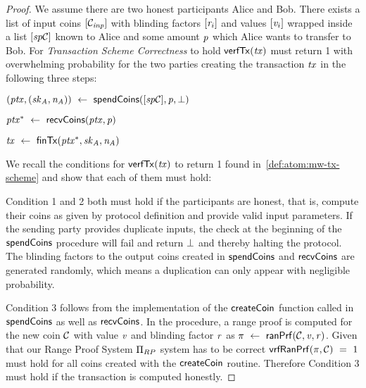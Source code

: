 \begin{proof}
    We assume there are two honest participants Alice and Bob.
    There exists a list of input coins $[\mathcal{C}_{\mathit{inp}}]$ with blinding factors $[\mathit{r}_i]$ and values $[\mathit{v}_i]$ wrapped inside a list $[\mathit{sp}\mathcal{C}]$ known to Alice and some amount $\mathit{p}$ which Alice wants to transfer to Bob.
    For \emph{Transaction Scheme Correctness} to hold $\mathsf{verfTx}(\mathit{tx})$ must return 1 with overwhelming probability for the two parties creating the transaction $\mathit{tx}$ in the following three steps:
    \begin{asparaenum}
        \item $(\mathit{ptx}, (\mathit{sk}_{\mathit{A}}, \mathit{\mathit{n}_{\mathit{A}}})) ~\leftarrow~ \mathsf{spendCoins}([\mathit{sp}\mathcal{C}],\mathit{p},\bot)$
        \item $\mathit{ptx}^* ~\leftarrow~ \mathsf{recvCoins}(\mathit{ptx},\mathit{p})$
        \item $\mathit{tx} ~\leftarrow~ \mathsf{finTx}(\mathit{ptx}^*,\mathit{sk}_{\mathit{A}},\mathit{\mathit{n}_{\mathit{A}}})$
    \end{asparaenum}
    We recall the conditions for $\mathsf{verfTx}(\mathit{tx})$ to return 1 found in~\cref{def:atom:mw-tx-scheme} and show that each of them must hold:

    Condition 1 and 2 both must hold if the participants are honest, that is, compute their coins as given by protocol definition and provide valid input parameters.
    If the sending party provides duplicate inputs, the check at the beginning of the $\mathsf{spendCoins}$ procedure will fail and return $\bot$ and thereby halting the protocol.
    The blinding factors to the output coins created in $\mathsf{spendCoins}$ and $\mathsf{recvCoins}$ are generated randomly, which means a duplication can only appear with negligible probability.

    Condition 3 follows from the implementation of the $\mathsf{createCoin}$ function called in $\mathsf{spendCoins}$ as well as $\mathsf{recvCoins}$.
    In the procedure, a range proof is computed for the new coin $\mathcal{C}$ with value $\mathit{v}$ and blinding factor $\mathit{r}$ as $\pi ~\leftarrow~ \mathsf{ranPrf}(\mathcal{C},\mathit{v},\mathit{r})$.
    Given that our Range Proof System $\Pi_{RP}$ system has to be correct $\mathsf{vrfRanPrf}(\pi,\mathcal{C}) ~=~ 1$ must hold for all coins created with the $\mathsf{createCoin}$ routine.
    Therefore Condition 3 must hold if the transaction is computed honestly.


\end{proof}

